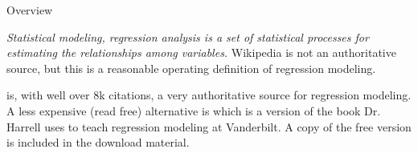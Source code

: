 \documentclass[11pt]{beamer}
\begin{document}
\begin{frame}{
	\begin{minipage}[t]{0.55\textwidth}
		Overview
	\end{minipage}
	\hfill
	\begin{minipage}[t]{0.35\textwidth}
		\flushright
	\end{minipage}
}{}
\textit{Statistical modeling, regression analysis is a set of statistical processes for estimating the relationships among variables.}\parencite{regressionWiki} Wikipedia is not an authoritative source, but this is a reasonable operating definition of regression modeling.

\vspace{0.5cm}

\cite{harrell2001ordinal} is, with well over 8k citations, a very authoritative source for regression modeling. A less expensive (read free) alternative is \parencite{harrell2013regression} which is a version of the book Dr. Harrell uses to teach regression modeling at Vanderbilt. A copy of the free version is included in the download material.  

\end{frame}
\end{document}
